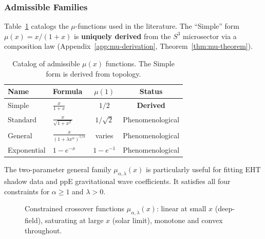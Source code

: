 \subsubsection{Admissible Families}

Table~\ref{tab:mu_catalog} catalogs the $\mu$-functions used in the \DFD literature. The ``Simple'' form $\mu(x) = x/(1+x)$ is \textbf{uniquely derived} from the $S^3$ microsector via a composition law (Appendix~\ref{app:mu-derivation}, Theorem~\ref{thm:mu-theorem}).

\begin{table}[h]
\caption{Catalog of admissible $\mu(x)$ functions. The Simple form is derived from topology.}
\label{tab:mu_catalog}
\begin{ruledtabular}
\begin{tabular}{llcc}
Name & Formula & $\mu(1)$ & Status \\
\hline
Simple & $\displaystyle\frac{x}{1+x}$ & $1/2$ & \textbf{Derived} \\[8pt]
Standard & $\displaystyle\frac{x}{\sqrt{1+x^2}}$ & $1/\sqrt{2}$ & Phenomenological \\[8pt]
General & $\displaystyle\frac{x}{(1+\lambda x^\alpha)^{1/\alpha}}$ & varies & Phenomenological \\[8pt]
Exponential & $1 - e^{-x}$ & $1-e^{-1}$ & Phenomenological \\
\end{tabular}
\end{ruledtabular}
\end{table}

The two-parameter general family $\mu_{\alpha,\lambda}(x)$ is particularly 
useful for fitting EHT shadow data and ppE gravitational wave coefficients. 
It satisfies all four constraints for $\alpha \geq 1$ and $\lambda > 0$.

\begin{figure}[t]
\centering
{}
\caption{Constrained crossover functions $\mu_{\alpha,\lambda}(x)$: 
linear at small $x$ (deep-field), saturating at large $x$ (solar limit), 
monotone and convex throughout.}
\label{fig:mu_family}
\end{figure}


